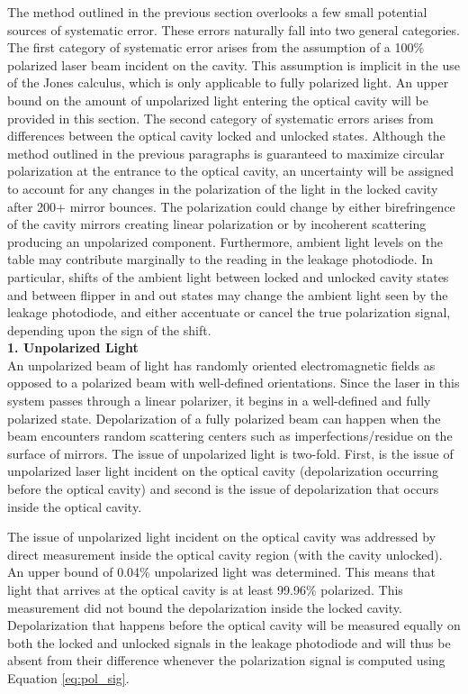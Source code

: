The method outlined in the previous section overlooks a few small potential sources of systematic error. These errors naturally fall into two general categories. The first category of systematic error arises from the assumption of a 100\% polarized laser beam incident on the cavity. This assumption is implicit in the use of the Jones calculus, which is only applicable to fully polarized light. An upper bound on the amount of unpolarized light entering the optical cavity will be provided in this section. The second category of systematic errors arises from differences between the optical cavity locked and unlocked states. Although the method outlined in the previous paragraphs is guaranteed to maximize circular polarization at the entrance to the optical cavity, an uncertainty will be assigned to account for any changes in the polarization of the light in the locked cavity after 200+ mirror bounces. The polarization could change by either birefringence of the cavity mirrors creating linear polarization or by incoherent scattering producing an unpolarized component. Furthermore, ambient light levels on the table may contribute marginally to the reading in the leakage photodiode. In particular, shifts of the ambient light between locked and unlocked cavity states and between flipper in and out states may change the ambient light seen by the leakage photodiode, and either accentuate or cancel the true polarization signal, depending upon the sign of the shift.\\
{\bf 1. Unpolarized Light}\\
An unpolarized beam of light has randomly oriented electromagnetic fields as opposed to a polarized beam with well-defined orientations. Since the laser in this system passes through a linear polarizer, it begins in a well-defined and fully polarized state. Depolarization of a fully polarized beam can happen when the beam encounters random scattering centers such as imperfections/residue on the surface of mirrors. The issue of unpolarized light is two-fold. First, is the issue of unpolarized laser light incident on the optical cavity (depolarization occurring before the optical cavity) and second is the issue of depolarization that occurs inside the optical cavity. 

The issue of unpolarized light incident on the optical cavity was addressed by direct measurement inside the optical cavity region (with the cavity unlocked). An upper bound of 0.04\% unpolarized light was determined. This means that light that arrives at the optical cavity is at least 99.96\% polarized. This measurement did not bound the depolarization inside the locked cavity. Depolarization that happens before the optical cavity will be measured equally on both the locked and unlocked signals in the leakage photodiode and will thus be absent from their difference whenever the polarization signal is computed using Equation \ref{eq:pol_sig}. 

